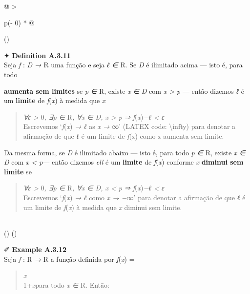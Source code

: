 \documentclass[
]{article}
\begin{document}
\begin{longtable}[]{@{}
  >{\raggedright\arraybackslash}p{(\columnwidth - 0\tabcolsep) * }@{}}
\toprule()
\begin{minipage}[b]{\linewidth}\raggedright
✦ \textbf{Definition A.3.11}\\
Seja \emph{f} : \emph{D →} R uma função e seja \emph{ℓ ∈} R. Se \emph{D}
é ilimitado acima --- isto é, para todo

\textbf{aumenta sem limites} se \emph{p ∈} R, existe \emph{x ∈ D} com
\emph{x \textgreater{} p} --- então dizemos \emph{ℓ} é um
\textbf{limite} de \emph{f}(\emph{x}) à medida que \emph{x}

\begin{quote}
\emph{∀ε \textgreater{}} 0\emph{, ∃p ∈} R\emph{, ∀x ∈ D, x
\textgreater{} p ⇒ \textbar{} f}(\emph{x})\emph{−ℓ\textbar{} \textless{}
ε}\\
Escrevemos `\emph{f}(\emph{x}) \emph{→ ℓ} as \emph{x →} ∞' (LATEX code:
\textbackslash infty) para denotar a afirmação de que \emph{ℓ} é um
limite de \emph{f}(\emph{x}) como \emph{x} aumenta sem limite.
\end{quote}

Da mesma forma, se \emph{D} é ilimitado abaixo --- isto é, para todo
\emph{p ∈} R, existe \emph{x ∈ D} com \emph{x \textless{} p}--- então
dizemos \emph{ell} é um \textbf{limite} de \emph{f}(\emph{x}) conforme
\emph{x} \textbf{diminui sem limite} se

\begin{quote}
\emph{∀ε \textgreater{}} 0\emph{, ∃p ∈} R\emph{, ∀x ∈ D, x \textless{} p
⇒ \textbar{} f}(\emph{x})\emph{−ℓ\textbar{} \textless{} ε}\\
Escrevemos `\emph{f}(\emph{x}) \emph{→ ℓ} como \emph{x → −}∞' para
denotar a afirmação de que \emph{ℓ} é um limite de \emph{f}(\emph{x}) à
medida que \emph{x} diminui sem limite.
\end{quote}\strut
\end{minipage} \\
\midrule()
\endhead
\bottomrule()
\end{longtable}

✐ \textbf{Example A.3.12}\\
Seja \emph{f} : R \emph{→} R a função definida por \emph{f}(\emph{x}) =

\begin{quote}
\emph{x}\\
1+\emph{\textbar x\textbar{}}para todo \emph{x ∈} R. Então:
\end{quote}
\end{document}
